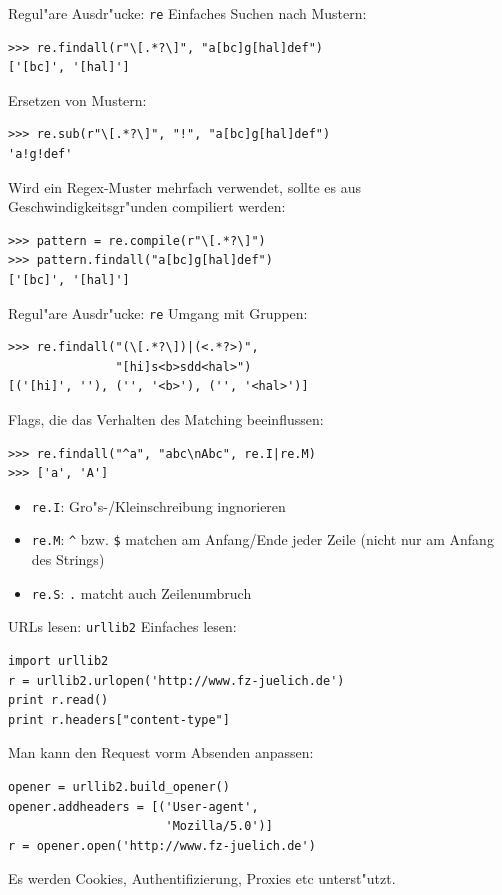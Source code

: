 \begin{frame}[fragile]{Regul"are Ausdr"ucke: \texttt{re}}
Einfaches Suchen nach Mustern:
\begin{lstlisting}[style=Shell]
>>> re.findall(r"\[.*?\]", "a[bc]g[hal]def")
['[bc]', '[hal]']
\end{lstlisting}
\vspace*{2mm}
Ersetzen von Mustern:
\begin{lstlisting}[style=Shell]
>>> re.sub(r"\[.*?\]", "!", "a[bc]g[hal]def")
'a!g!def'
\end{lstlisting}
\vspace*{2mm}
Wird ein Regex-Muster mehrfach verwendet, sollte es aus Geschwindigkeitsgr"unden compiliert werden:
\begin{lstlisting}[style=Shell]
>>> pattern = re.compile(r"\[.*?\]")
>>> pattern.findall("a[bc]g[hal]def")
['[bc]', '[hal]']
\end{lstlisting}
\end{frame}

\begin{frame}[fragile]{Regul"are Ausdr"ucke: \texttt{re}}
Umgang mit Gruppen:
\begin{lstlisting}[style=Shell]
>>> re.findall("(\[.*?\])|(<.*?>)", 
               "[hi]s<b>sdd<hal>")
[('[hi]', ''), ('', '<b>'), ('', '<hal>')]
\end{lstlisting}
\vspace*{2mm}
Flags, die das Verhalten des Matching beeinflussen:
\begin{lstlisting}[style=Shell]
>>> re.findall("^a", "abc\nAbc", re.I|re.M)
>>> ['a', 'A']
\end{lstlisting}
\begin{itemize}
\item \texttt{re.I}: Gro"s-/Kleinschreibung ingnorieren
\item \texttt{re.M}: \lstinline{^} bzw. \lstinline{$} matchen am Anfang/Ende jeder Zeile (nicht nur am Anfang des Strings) %
\item \texttt{re.S}: \lstinline{.} matcht auch Zeilenumbruch
\end{itemize}
\end{frame}


\begin{frame}[fragile]{URLs lesen: \texttt{urllib2}}
Einfaches lesen:
\begin{lstlisting}
import urllib2
r = urllib2.urlopen('http://www.fz-juelich.de')
print r.read()
print r.headers["content-type"]
\end{lstlisting}
Man kann den Request vorm Absenden anpassen:
\begin{lstlisting}
opener = urllib2.build_opener()
opener.addheaders = [('User-agent', 
                      'Mozilla/5.0')]
r = opener.open('http://www.fz-juelich.de')
\end{lstlisting}
Es werden Cookies, Authentifizierung, Proxies etc unterst"utzt.
\end{frame}


